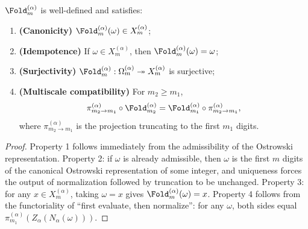 \begin{proposition}\label{prop:fold-alpha-basic}
$\Fold_m^{(\alpha)}$ is well-defined and satisfies:
\begin{enumerate}
  \item \textbf{(Canonicity)} $\Fold_m^{(\alpha)}(\omega)\in X_m^{(\alpha)}$;
  \item \textbf{(Idempotence)} If $\omega\in X_m^{(\alpha)}$, then $\Fold_m^{(\alpha)}(\omega)=\omega$;
  \item \textbf{(Surjectivity)} $\Fold_m^{(\alpha)}:\Omega_m^{(\alpha)}\twoheadrightarrow X_m^{(\alpha)}$ is surjective;
  \item \textbf{(Multiscale compatibility)} For $m_2\ge m_1$,
  \[
  \pi_{m_2\to m_1}^{(\alpha)}\circ \Fold_{m_2}^{(\alpha)}=\Fold_{m_1}^{(\alpha)}\circ \pi_{m_2\to m_1}^{(\alpha)},
  \]
  where $\pi_{m_2\to m_1}^{(\alpha)}$ is the projection truncating to the first $m_1$ digits.
\end{enumerate}
\end{proposition}

\begin{proof}
Property 1 follows immediately from the admissibility of the Ostrowski representation. Property 2: if $\omega$ is already admissible, then $\omega$ is the first $m$ digits of the canonical Ostrowski representation of some integer, and uniqueness forces the output of normalization followed by truncation to be unchanged. Property 3: for any $x\in X_m^{(\alpha)}$, taking $\omega=x$ gives $\Fold_m^{(\alpha)}(\omega)=x$. Property 4 follows from the functoriality of ``first evaluate, then normalize'': for any $\omega$, both sides equal $\pi_{m_1}^{(\alpha)}(Z_\alpha(N_\alpha(\omega)))$.
\end{proof}

